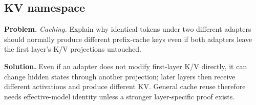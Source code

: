 \subsection{KV namespace}
\textbf{Problem.} \emph{Caching.} Explain why identical tokens under two different adapters should
normally produce different prefix-cache keys even if both adapters leave the first
layer's K/V projections untouched.

\textbf{Solution.} Even if an adapter does not modify first-layer K/V directly, it can change hidden
states through another projection; later layers then receive different activations and
produce different KV. General cache reuse therefore needs effective-model identity
unless a stronger layer-specific proof exists.
